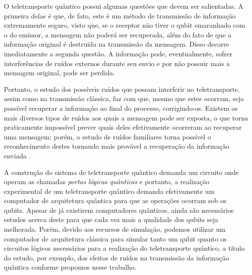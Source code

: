 \documentclass[11pt,oneside,brazil,hidelinks,article,sumario=tradicional,a4paper]{abntex2}
\begin{document}
O teletransporte quântico possui algumas questões que devem ser salientadas. A primeira delas é que, de fato, este é um método de transmissão de informação extremamente seguro, visto que, se o receptor não tiver o qubit emaranhado com o do emissor, a mensagem não poderá ser recuperada, além do fato de que a informação original é destruída na transmissão da mensagem. Disso decorre imediatamente a segunda questão. A informação pode, eventualmente, sofrer interferências de ruídos externos durante seu envio e por não possuir mais a mensagem original, pode ser perdida.

Portanto, o estudo dos possíveis ruídos que possam interferir no teletransporte, assim como na transmissão clássica, faz com que, mesmo que estes ocorram, seja possível recuperar a informação ao final do processo, corrigindo-os. Existem os mais diversos tipos de ruídos aos quais a mensagem pode ser exposta, o que torna praticamente impossível prever quais deles efetivamente ocorreram ao recuperar uma mensagem; porém, o estudo de ruídos familiares torna possível o reconhecimento destes tornando mais provável a recuperação da informação enviada \cite{fonzar}.

A construção do sistema de teletransporte quântico demanda um circuito onde operam as chamadas \textit{portas lógicas quânticas} e portanto, a realização experimental de um teletransporte quântico demanda efetivamente um computador de arquitetura quântica para que as operações ocorram sob os qubits. Apesar de já existirem computadores quânticos, ainda são necessários estudos acerca deste para que cada vez mais a qualidade dos qubits seja melhorada. Porém, devido aos recursos de simulação, podemos utilizar um computador de arquitetura clássica para simular tanto um qubit quanto os circuitos lógicos necessários para a realização do teletransporte quântico, a título do estudo, por exemplo, dos efeitos de ruídos na transmissão da informação quântica conforme propomos nesse trabalho.



\clearpage


\end{document}
